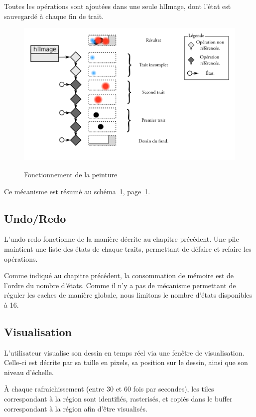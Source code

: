 			Toutes les opérations sont ajoutées dans une seule hlImage, dont l'état
			est sauvegardé à chaque fin de trait.
		\begin{figure}[ht]
			\centering
			\includegraphics[width=\textwidth]{images/draw} 
			\label{fig:draw}
			\caption{Fonctionnement de la peinture}
		\end{figure}

			Ce mécanisme est résumé au schéma~\ref{fig:draw}, page~\ref{fig:draw}.
			
		\subsection{Undo/Redo}
			L'undo redo fonctionne de la manière décrite au chapitre précédent.
			Une pile maintient une liste des états de chaque traits, permettant de défaire
			et refaire les opérations. 

			Comme indiqué au chapitre précédent, la consommation de mémoire est de
			l'ordre du nombre d'états. Comme il n'y a pas de mécanisme permettant de
			réguler les caches de manière globale, nous limitons le nombre d'états disponibles
			à 16.
		\subsection{Visualisation}
			L'utilisateur visualise son dessin en temps réel via une fenêtre de visualisation.
			Celle-ci est décrite par sa taille en pixels, sa position sur le dessin, ainsi
			que son niveau d'échelle. 
			
			À chaque rafraichissement (entre 30 et 60 fois par secondes), les tiles correspondant
			à la région sont identifiés, rasterisés, et copiés dans le buffer correspondant à la région
			afin d'être visualisés. 

